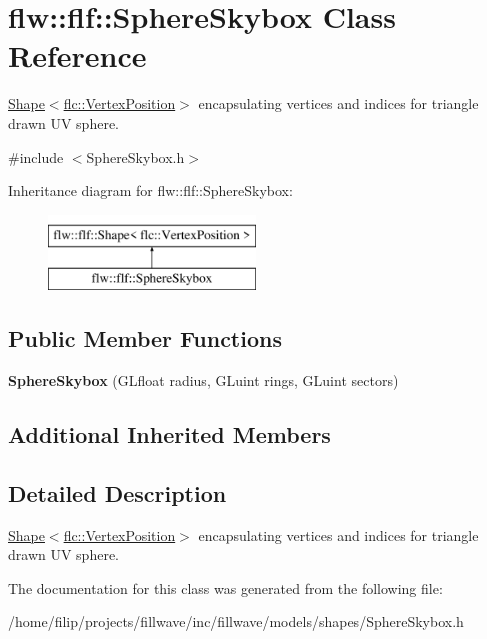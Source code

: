 \hypertarget{classflw_1_1flf_1_1SphereSkybox}{}\section{flw\+:\+:flf\+:\+:Sphere\+Skybox Class Reference}
\label{classflw_1_1flf_1_1SphereSkybox}


\hyperlink{classflw_1_1flf_1_1Shape}{Shape$<$flc\+::\+Vertex\+Position$>$} encapsulating vertices and indices for triangle drawn UV sphere.  




{\ttfamily \#include $<$Sphere\+Skybox.\+h$>$}

Inheritance diagram for flw\+:\+:flf\+:\+:Sphere\+Skybox\+:\begin{figure}[H]
\begin{center}
\leavevmode
\includegraphics[height=2.000000cm]{classflw_1_1flf_1_1SphereSkybox}
\end{center}
\end{figure}
\subsection*{Public Member Functions}
\begin{DoxyCompactItemize}
\item 
\mbox{\label{classflw_1_1flf_1_1SphereSkybox_a978aaf6c0bf7d5898e8cf2a34bd6b356}} 
{\bfseries Sphere\+Skybox} (G\+Lfloat radius, G\+Luint rings, G\+Luint sectors)
\end{DoxyCompactItemize}
\subsection*{Additional Inherited Members}


\subsection{Detailed Description}
\hyperlink{classflw_1_1flf_1_1Shape}{Shape$<$flc\+::\+Vertex\+Position$>$} encapsulating vertices and indices for triangle drawn UV sphere. 

The documentation for this class was generated from the following file\+:\begin{DoxyCompactItemize}
\item 
/home/filip/projects/fillwave/inc/fillwave/models/shapes/Sphere\+Skybox.\+h\end{DoxyCompactItemize}
